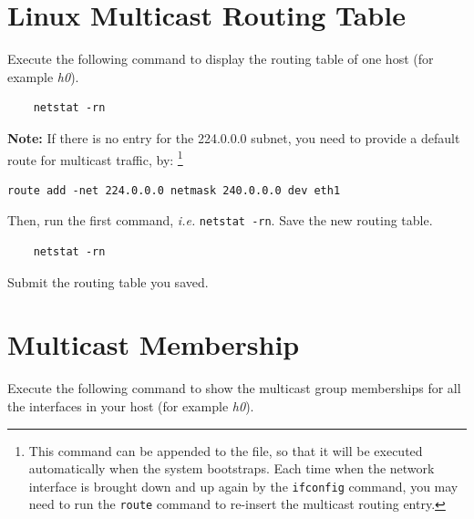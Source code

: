 \documentclass{UTNetLab}
\begin{document}
\section{Linux Multicast Routing Table\label{sec:rt}}
\label{sec:linux-multicast-routing}
    Execute the following command to display the routing table of one host (for example \textit{h0}).

    \begin{lstlisting}
	netstat -rn
    \end{lstlisting}
    
    \textbf{Note: }If there is no entry for the 224.0.0.0 subnet, you need to provide a default route for multicast traffic, by:
    \footnote{This command can be appended to the  file, so that it will be executed automatically when the system bootstraps.
    Each time when the network interface is brought down and up again by the \lstinline{ifconfig} command, you may need to run the \lstinline{route} command to re-insert the multicast routing entry.}

    \begin{lstlisting}[emph=eth0]
	route add -net 224.0.0.0 netmask 240.0.0.0 dev eth1
    \end{lstlisting}
    
    Then, run the first command, \textit{i.e.} \lstinline{netstat -rn}. Save the new routing table.
    
    \begin{lstlisting}
    netstat -rn
    \end{lstlisting}
    
    \begin{report}
        \item Submit the routing table you saved.
    \end{report}

\section{Multicast Membership}
    Execute the following command to show the multicast group memberships for all the interfaces in your host (for example \textit{h0}).
\end{document}
